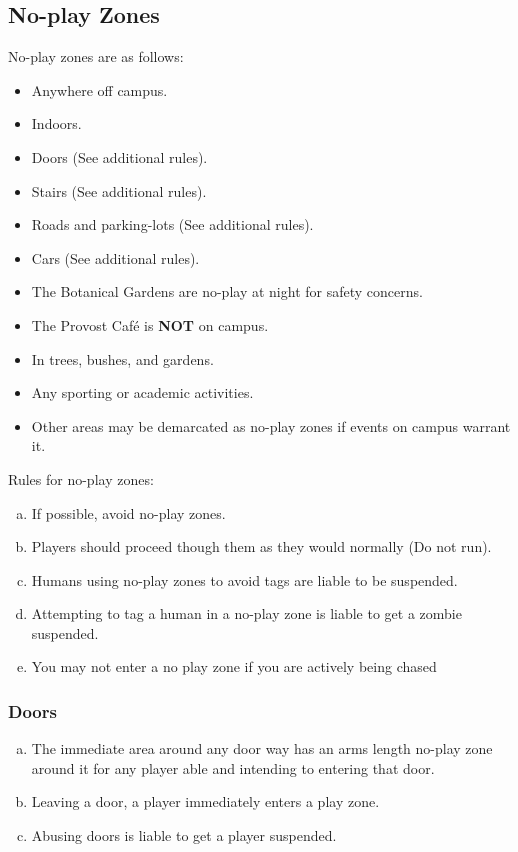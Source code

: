 \documentclass[a4paper,12pt]{article}
\begin{document}
\subsection{No-play Zones}
No-play zones are as follows:
\begin{itemize}
    \item Anywhere off campus.
    \item Indoors.
    \item Doors (See additional rules).
    \item Stairs (See additional rules).
    \item Roads and parking-lots (See additional rules).
    \item Cars (See additional rules).
    \item The Botanical Gardens are no-play at night for safety concerns.
    \item The Provost Caf\'e is {\bf NOT} on campus. 
    \item In trees, bushes, and gardens.
    \item Any sporting or academic activities.
    \item Other areas may be demarcated as no-play zones if events on campus warrant it.
\end{itemize}

Rules for no-play zones:
\begin{enumerate}[(a)]
    \item If possible, avoid no-play zones.
    \item Players should proceed though them as they would normally (Do not run).
    \item Humans using no-play zones to avoid tags are liable to be suspended.     
    \item Attempting to tag a human in a no-play zone is liable to get a zombie suspended.
    \item You may not enter a no play zone if you are actively being chased
\end{enumerate}

\subsubsection{Doors}
\begin{enumerate}[(a)]
    \item The immediate area around any door way has an arms length no-play zone around it for any player able and intending to entering that door. 
    \item Leaving a door, a player immediately enters a play zone.
    \item Abusing doors is liable to get a player suspended.
\end{enumerate}
\end{document}
